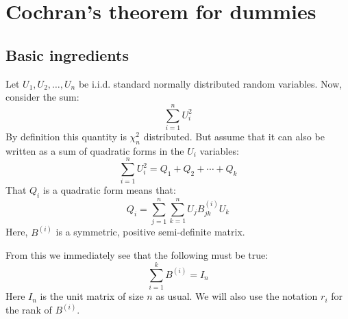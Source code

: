 \documentclass[12pt, a4paper]{article}
\begin{document}
\section{Cochran's theorem for dummies}
\subsection{Basic ingredients}
\label{ingredients}
Let $U_1, U_2, \ldots , U_n$ be i.i.d. standard normally distributed random variables. Now, consider the sum:
\begin{equation}
\sum_{i=1}^n U_i^2
\end{equation}
By definition this quantity is $\chi^2_n$ distributed. But assume that it can also be written as a sum of quadratic forms in the $U_i$ variables:
\begin{equation}
\sum_{i=1}^n U_i^2 = Q_1 + Q_2 + \cdots + Q_k
\end{equation}
That $Q_i$ is a quadratic form means that:
\begin{equation}
Q_i=\sum_{j=1}^n\sum_{k=1}^n U_j B^{(i)}_{jk}U_k
\end{equation} 
Here, $B^{(i)}$ is a symmetric, positive semi-definite matrix.\par
From this we immediately see that the following must be true:
\begin{equation}
\label{b_sum}
\sum_{i=1}^k B^{(i)}=I_n
\end{equation}
Here $I_n$ is the unit matrix of size $n$ as usual. We will also use the notation $r_i$ for the rank of $B^{(i)}$.
\end{document}
